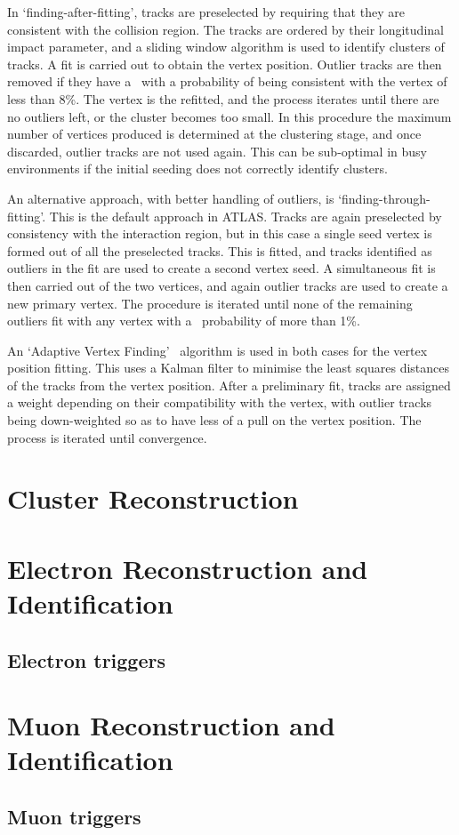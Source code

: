 In `finding-after-fitting',
tracks are preselected by requiring that they are consistent with the collision
region. The tracks are ordered by their longitudinal impact parameter, and a
sliding window algorithm is used to identify clusters of tracks. A fit is 
carried out to obtain the vertex position. Outlier tracks are then removed if
they have a \chisquared\ with a probability of being consistent with the vertex
of less than 8\%. The vertex is the refitted, and the process iterates until
there are no outliers left, or the cluster becomes too small. In this procedure
the maximum number of vertices produced is determined at the clustering stage, and
once discarded, outlier tracks are not used again. This can be sub-optimal in
busy environments if the initial seeding does not correctly identify clusters.

An alternative approach, with better handling of outliers, is
`finding-through-fitting'. This is the default approach in ATLAS. Tracks are
again preselected by consistency with the interaction region, but in this case a
single seed vertex is formed out of all the preselected tracks. This is fitted, and
tracks identified as outliers in the fit are used to create a second vertex
seed. A simultaneous fit is then carried out of the two vertices, and again
outlier tracks are used to create a new primary vertex. The procedure is
iterated until none of the remaining outliers fit with any vertex with a
\chisquared\ probability of more than 1\%.

An `Adaptive Vertex Finding'~\cite{0954-3899-34-12-N01} algorithm is used in
both cases for the vertex position fitting. 
This uses a Kalman filter to minimise the least squares distances of the tracks from
the vertex position. After a preliminary fit, tracks are assigned a
weight depending on their compatibility with the vertex, with outlier tracks
being down-weighted so as to have less of a pull on the vertex position. The
process is iterated until convergence.

\section{Cluster Reconstruction}
\label{sec:reco-clustering}

\section{Electron Reconstruction and Identification}
\label{sec:reco-el}

\subsection{Electron triggers}
\label{sec:reco-el-triggers}

\section{Muon Reconstruction and Identification}
\label{sec:reco-mu}

\subsection{Muon triggers}
\label{sec:reco-mu-triggers}
